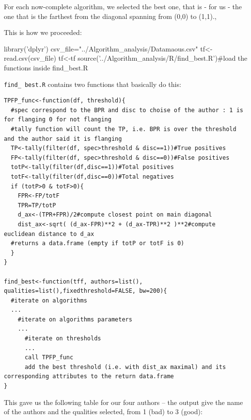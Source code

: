 \documentclass{article}\usepackage[]{graphicx}\usepackage[]{color}
\begin{document}
For each now-complete algorithm, we selected the best one, that is - for us - the one that is the farthest from the diagonal spanning from (0,0) to (1,1).,

This is how we proceeded:

\begin{Schunk}
\begin{Sinput}
library('dplyr')
csv_file="../Algorithm_analysis/Datamaous.csv"
tf<-read.csv(csv_file)
tf<-tf %
source('../Algorithm_analysis/R/find_best.R')#load the functions inside find_best.R
\end{Sinput}
\end{Schunk}

{\tt find\_ best.R} contains two functions that basically do this:

\begin{lstlisting}[style=Rstyle, caption={\tt find\_ best.R},label=code:findbest]
TPFP_func<-function(df, threshold){
  #spec correspond to the BPR and disc to choise of the author : 1 is for flanging 0 for not flanging
  #tally function will count the TP, i.e. BPR is over the threshold and the author said it is flanging
  TP<-tally(filter(df, spec>threshold & disc==1))#True positives
  FP<-tally(filter(df, spec>threshold & disc==0))#False positives
  totP<-tally(filter(df,disc==1))#Total positives
  totF<-tally(filter(df,disc==0))#Total negatives
  if (totP>0 & totF>0){
    FPR<-FP/totF
    TPR=TP/totP
    d_ax<-(TPR+FPR)/2#compute closest point on main diagonal
    dist_ax<-sqrt( (d_ax-FPR)**2 + (d_ax-TPR)**2 )**2#compute euclidean distance to d_ax
  #returns a data.frame (empty if totP or totF is 0)
  }
}

find_best<-function(tff, authors=list(), qualities=list(),fixedthreshold=FALSE, bw=200){
  #iterate on algorithms
  ...
    #iterate on algorithms parameters
    ...
      #iterate on thresholds
      ...
      call TPFP_func
      add the best threshold (i.e. with dist_ax maximal) and its corresponding attributes to the return data.frame
}
\end{lstlisting}

This gave us the following table for our four authors -- the output give the name of the authors and the qualities selected, from 1 (bad) to 3 (good):
\end{document}
